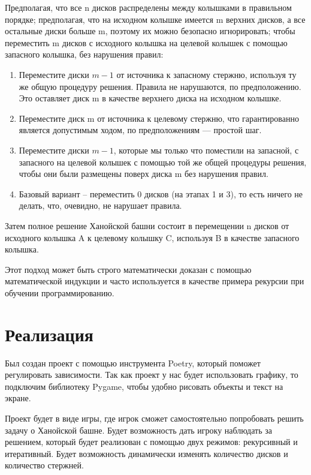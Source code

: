 Предполагая, что все n дисков распределены между колышками в правильном
порядке; предполагая, что на исходном колышке имеется m верхних дисков, а все
остальные диски больше m, поэтому их можно безопасно игнорировать; чтобы
переместить m дисков с исходного колышка на целевой колышек с помощью запасного
колышка, без нарушения правил:

\begin{enumerate}
	\item Переместите диски $m - 1$ от источника к запасному стержню, используя ту
	      же общую процедуру решения. Правила не нарушаются, по предположению. Это
	      оставляет диск m в качестве верхнего диска на исходном колышке.
	\item Переместите диск m от источника к целевому стержню, что гарантированно
	      является допустимым ходом, по предположениям — простой шаг.
	\item Переместите диски $m - 1$, которые мы только что поместили на запасной, с
	      запасного на целевой колышек с помощью той же общей процедуры решения,
	      чтобы они были размещены поверх диска m без нарушения правил.
	\item Базовый вариант – переместить 0 дисков (на этапах 1 и 3), то есть
	      ничего не делать, что, очевидно, не нарушает правила.
\end{enumerate}

Затем полное решение Ханойской башни состоит в перемещении n дисков от
исходного колышка A к целевому колышку C, используя B в качестве запасного
колышка.

Этот подход может быть строго математически доказан с помощью математической
индукции и часто используется в качестве примера рекурсии при обучении
программированию.

\section{Реализация}

Был создан проект с помощью инструмента Poetry\cite{Poetry}, который поможет регулировать
зависимости. Так как проект у нас будет использовать графику, то подключим
библиотеку Pygame\cite{Pygame}, чтобы удобно рисовать объекты и текст на экране.

Проект будет в виде игры, где игрок сможет самостоятельно попробовать решить
задачу о Ханойской башне. Будет возможность дать игроку наблюдать за решением,
который будет реализован с помощью двух режимов: рекурсивный и итеративный.
Будет возможность динамически изменять количество дисков и количество стержней.

